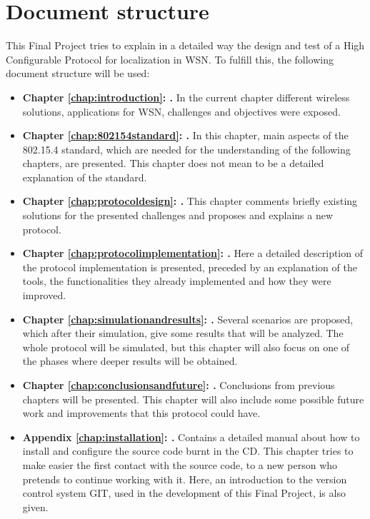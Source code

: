 \section{Document structure}

This Final Project tries to explain in a detailed way the design and test of a High Configurable Protocol for localization in \ac{WSN}. To 
fulfill this, the following document structure will be used:

\begin{itemize}
 \item \textbf{Chapter \ref{chap:introduction}: .} In the current chapter different wireless solutions, applications
for \ac{WSN}, challenges and objectives were exposed.
 \item \textbf{Chapter \ref{chap:802154standard}: .} In this chapter, main aspects of the 802.15.4 standard, which
are needed for the understanding of the following chapters, are presented. This chapter does not mean to be a detailed explanation of the 
standard.
 \item \textbf{Chapter \ref{chap:protocoldesign}: .} This chapter comments briefly existing solutions for the
presented challenges and proposes and explains a new protocol.
 \item \textbf{Chapter \ref{chap:protocolimplementation}: .} Here a detailed description of the protocol 
implementation is presented, preceded by an explanation of the tools, the functionalities they already implemented and how they were
improved.
 \item \textbf{Chapter \ref{chap:simulationandresults}: .} Several scenarios are proposed, which after their
simulation, give some results that will be analyzed. The whole protocol will be simulated, but this chapter will also focus on one of the 
phases where deeper results will be obtained.
 \item \textbf{Chapter \ref{chap:conclusionsandfuture}: .} Conclusions from previous chapters will be 
presented. This chapter will also include some possible future work and improvements that this protocol could have.
 \item \textbf{Appendix \ref{chap:installation}: .} Contains a detailed manual about how to install and configure 
the source code burnt in the \ac{CD}. This chapter tries to make easier the first contact with the source code, to a new person who pretends
to continue working with it. Here, an introduction to the version control system GIT, used in the development of this Final Project, is also 
given.
\end{itemize}

